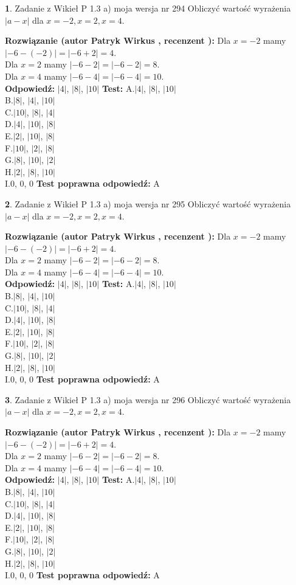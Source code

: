 \documentclass[12pt, a4paper]{article}
\theoremstyle{definition} %
\newtheorem{zad}{}
\newcommand{\zadStart}[1]{\begin{zad}#1\newline}
\newcommand{\zadStop}{\end{zad}}
\newcommand{\rozwStart}[2]{\noindent \textbf{Rozwiązanie (autor #1 , recenzent #2): }\newline}
\newcommand{\rozwStop}{\newline}
\newcommand{\odpStart}{\noindent \textbf{Odpowiedź:}\newline}
\newcommand{\odpStop}{\newline}
\newcommand{\testStart}{\noindent \textbf{Test:}\newline}
\newcommand{\testStop}{\newline}
\newcommand{\kluczStart}{\noindent \textbf{Test poprawna odpowiedź:}\newline}
\newcommand{\kluczStop}{\newline}
\begin{document}
\zadStart{Zadanie z Wikieł P 1.3 a) moja wersja nr 294}
Obliczyć wartość wyrażenia $|a - x|$ dla $x=-2,x=2,x=4$.
\zadStop
\rozwStart{Patryk Wirkus}{}
Dla $x = -2$ mamy $|-6 - (-2)| = |-6 + 2| = 4$.\\
Dla $x = 2$ mamy $|-6 - 2| = |-6 - 2| = 8$.\\
Dla $x = 4$ mamy $|-6 - 4| = |-6 - 4| = 10$.\\
\rozwStop
\odpStart
$|4|$, $|8|$, $|10|$
\odpStop
\testStart
A.$|4|$, $|8|$, $|10|$\\
B.$|8|$, $|4|$, $|10|$\\
C.$|10|$, $|8|$, $|4|$\\
D.$|4|$, $|10|$, $|8|$\\
E.$|2|$, $|10|$, $|8|$\\
F.$|10|$, $|2|$, $|8|$\\
G.$|8|$, $|10|$, $|2|$\\
H.$|2|$, $|8|$, $|10|$\\
I.$0$, $0$, $0$
\testStop
\kluczStart
A
\kluczStop



\zadStart{Zadanie z Wikieł P 1.3 a) moja wersja nr 295}
Obliczyć wartość wyrażenia $|a - x|$ dla $x=-2,x=2,x=4$.
\zadStop
\rozwStart{Patryk Wirkus}{}
Dla $x = -2$ mamy $|-6 - (-2)| = |-6 + 2| = 4$.\\
Dla $x = 2$ mamy $|-6 - 2| = |-6 - 2| = 8$.\\
Dla $x = 4$ mamy $|-6 - 4| = |-6 - 4| = 10$.\\
\rozwStop
\odpStart
$|4|$, $|8|$, $|10|$
\odpStop
\testStart
A.$|4|$, $|8|$, $|10|$\\
B.$|8|$, $|4|$, $|10|$\\
C.$|10|$, $|8|$, $|4|$\\
D.$|4|$, $|10|$, $|8|$\\
E.$|2|$, $|10|$, $|8|$\\
F.$|10|$, $|2|$, $|8|$\\
G.$|8|$, $|10|$, $|2|$\\
H.$|2|$, $|8|$, $|10|$\\
I.$0$, $0$, $0$
\testStop
\kluczStart
A
\kluczStop



\zadStart{Zadanie z Wikieł P 1.3 a) moja wersja nr 296}
Obliczyć wartość wyrażenia $|a - x|$ dla $x=-2,x=2,x=4$.
\zadStop
\rozwStart{Patryk Wirkus}{}
Dla $x = -2$ mamy $|-6 - (-2)| = |-6 + 2| = 4$.\\
Dla $x = 2$ mamy $|-6 - 2| = |-6 - 2| = 8$.\\
Dla $x = 4$ mamy $|-6 - 4| = |-6 - 4| = 10$.\\
\rozwStop
\odpStart
$|4|$, $|8|$, $|10|$
\odpStop
\testStart
A.$|4|$, $|8|$, $|10|$\\
B.$|8|$, $|4|$, $|10|$\\
C.$|10|$, $|8|$, $|4|$\\
D.$|4|$, $|10|$, $|8|$\\
E.$|2|$, $|10|$, $|8|$\\
F.$|10|$, $|2|$, $|8|$\\
G.$|8|$, $|10|$, $|2|$\\
H.$|2|$, $|8|$, $|10|$\\
I.$0$, $0$, $0$
\testStop
\kluczStart
A
\kluczStop
\end{document}
